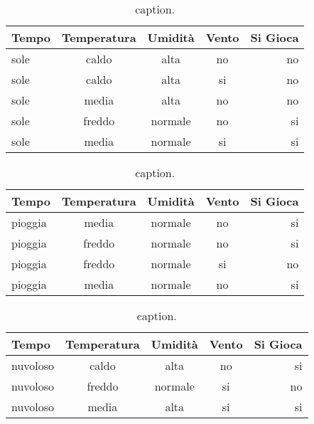 \begin{table}[h!]
	\begin{center}
		\begin{tabular}{l|c|c|c|r} %
			\textbf{Tempo} & \textbf{Temperatura} & \textbf{Umidità} & \textbf{Vento} & \textbf{Si Gioca}\\
			\hline
			sole     & caldo  & alta    & no & no \\
			sole     & caldo  & alta    & si & no \\
			sole     & media  & alta    & no & no \\
			sole     & freddo & normale & no & si \\
			sole     & media  & normale & si & si
		\end{tabular}
		\caption{caption.}
		\label{tab:data-set-example_2}
		
		\begin{tabular}{l|c|c|c|r} %
			\textbf{Tempo} & \textbf{Temperatura} & \textbf{Umidità} & \textbf{Vento} & \textbf{Si Gioca}\\
			\hline
			pioggia  & media  & normale & no & si \\
			pioggia  & freddo & normale & no & si \\
			pioggia  & freddo & normale & si & no \\
			pioggia  & media  & normale & no & si \\
		\end{tabular}
		\caption{caption.}
		\label{tab:data-set-example_3}
		
		\begin{tabular}{l|c|c|c|r} %
			\textbf{Tempo} & \textbf{Temperatura} & \textbf{Umidità} & \textbf{Vento} & \textbf{Si Gioca}\\
			\hline
			nuvoloso & caldo  & alta    & no & si \\
			nuvoloso & freddo & normale & si & no \\
			nuvoloso & media  & alta    & si & si \\
		\end{tabular}
		\caption{caption.}
		\label{tab:data-set-example_4}
		
	\end{center}
\end{table}

